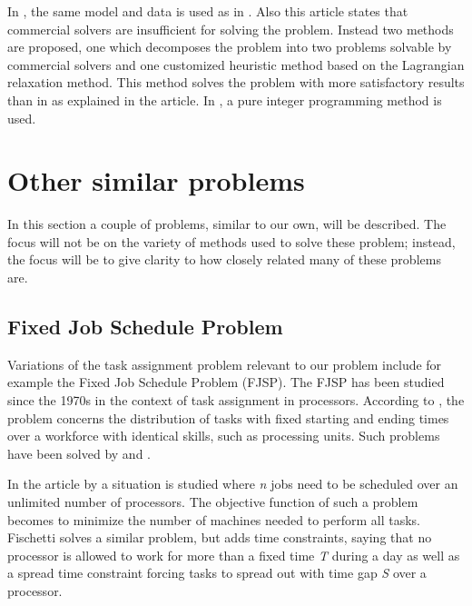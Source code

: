 In \citet{hojati_2011}, the same model and data is used as in \citet{loucks_1991}. Also this article states that commercial solvers are insufficient for solving the problem. Instead two methods are proposed, one which decomposes the problem into two problems solvable by commercial solvers and one customized heuristic method based on the Lagrangian relaxation method. This method solves the problem with more satisfactory results than in \citet{loucks_1991} as explained in the article. In \citet{choi_hwang_park_2009}, a pure integer programming method is used.


\section{Other similar problems}\label{other}
In this section a couple of problems, similar to our own, will be described. The focus will not be on the variety of methods used to solve these problem; instead, the focus will be to give clarity to how closely related many of these problems are.
\subsection{Fixed Job Schedule Problem}
Variations of the task assignment problem relevant to our problem include for example the Fixed Job Schedule Problem (FJSP). The FJSP has been studied since the 1970s in the context of task assignment in processors. According to \citet{krishnamoorthy_2012}, the problem concerns the distribution of tasks with fixed starting and ending times over a workforce with identical skills, such as processing units. Such problems have been solved by \citet{gertsbakh_1977} and \citet{fischetti_1992}.

In the article by \citet{gertsbakh_1977} a situation is studied where \textit{n} jobs need to be scheduled over an unlimited number of processors. The objective function of such a problem becomes to minimize the number of machines needed to perform all tasks. Fischetti solves a similar problem, but adds time constraints, saying that no processor is allowed to work for more than a fixed time \textit{T} during a day as well as a spread time constraint forcing tasks to spread out with time gap \textit{S} over a processor.

 	
